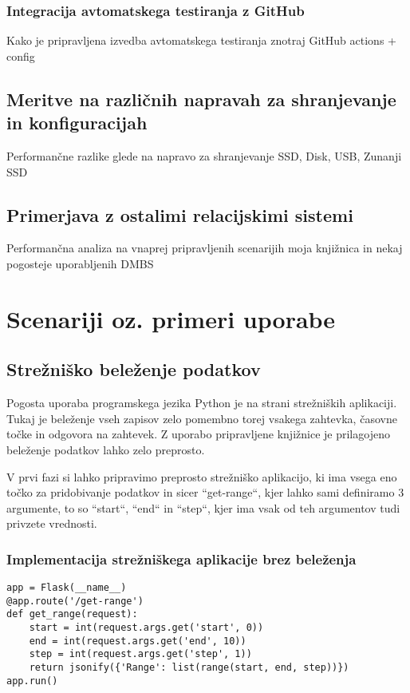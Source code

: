 \documentclass[a4paper,12pt,openright]{book}
\begin{document}
   \subsection{Integracija avtomatskega testiranja z GitHub}

   \colorbox{BurntOrange}{Kako je pripravljena izvedba avtomatskega testiranja znotraj GitHub actions + config}
   
   \section{Meritve na različnih napravah za shranjevanje in konfiguracijah}
   \colorbox{BurntOrange}{Performančne razlike glede na napravo za shranjevanje}
   \newline
   \colorbox{BurntOrange}{SSD, Disk, USB, Zunanji SSD}
   
   \section{Primerjava z ostalimi relacijskimi sistemi}
   \colorbox{BurntOrange}{Performančna analiza na vnaprej pripravljenih scenarijih}
   \newline
   \colorbox{BurntOrange}{moja knjižnica in nekaj pogosteje uporabljenih DMBS}
    
\chapter{Scenariji oz. primeri uporabe}
\label{ch3}
    \section{Strežniško beleženje podatkov}

    Pogosta uporaba programskega jezika Python je na strani strežniških aplikaciji. Tukaj je beleženje vseh zapisov zelo pomembno torej vsakega zahtevka, časovne točke in odgovora na zahtevek. Z uporabo pripravljene knjižnice je prilagojeno beleženje podatkov lahko zelo preprosto.

    V prvi fazi si lahko pripravimo preprosto strežniško aplikacijo, ki ima vsega eno točko za pridobivanje podatkov in sicer ``get-range``, kjer lahko sami definiramo 3 argumente, to so ``start``, ``end`` in ``step``, kjer ima vsak od teh argumentov tudi privzete vrednosti.

    \subsection{Implementacija strežniškega aplikacije brez beleženja}
\begin{verbatim}
app = Flask(__name__)
@app.route('/get-range')
def get_range(request):
    start = int(request.args.get('start', 0))
    end = int(request.args.get('end', 10))
    step = int(request.args.get('step', 1))
    return jsonify({'Range': list(range(start, end, step))})
app.run()
\end{verbatim}
\end{document}
